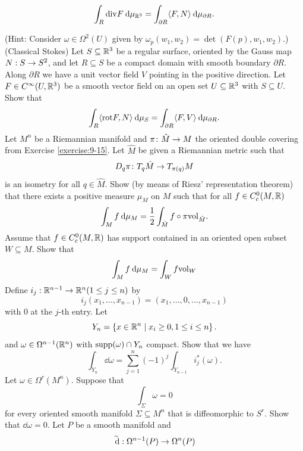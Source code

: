 \begin{enumerate}[label=\theexercise.\arabic*.,ref=\theexercise.\arabic*,leftmargin=2.7em]
    \[
      \int_{R}\R{div}{F}\dd{\mu }_{{\RR}^{3}} =\int_{\partial R}\langle F,N\rangle \dd{\mu }_{\partial R}.
    \]
    \par(Hint: Consider $\omega  \in  {\Omega }^{2}( U)$ given by ${\omega }_{p}( {{w}_{1},{w}_{2}})  = \det ( {F( p),{w}_{1},{w}_{2}})$.)
  \NewItem (Classical Stokes) Let $S \subseteq  {\ensuremath{\mathbb{R}}}^{3}$ be a regular surface, oriented by the Gauss map $N : S \rightarrow  {S}^{2}$, and let $R \subseteq  S$ be a compact domain with smooth boundary $\partial R$. Along $\partial R$ we have a unit vector field $V$ pointing in the positive direction. Let $F \in  {C}^{\infty }( {U,{\mathbb{R}}^{3}})$ be a smooth vector field on an open set $U \subseteq  {\ensuremath{\mathbb{R}}}^{3}$ with $S \subseteq  U$. Show that
    \[
      \int_{R}\langle \R{rot}F,N\rangle \dd{\mu }_{S} =\int_{\partial R}\langle F,V\rangle \dd{\mu }_{\partial R}.
    \]
  \NewItem Let ${M}^{n}$ be a Riemannian manifold and $\pi\colon  \hat{M} \rightarrow  M$ the oriented double covering from Exercise \ref{exercise:9-15}. Let $\hat{M}$ be given a Riemannian metric such that
    \[
      {D}_{q}\pi\colon  {T}_{q}\hat{M} \rightarrow  {T}_{\pi ( q) }M
    \]
    is an isometry for all $q \in  \hat{M}$.
    Show (by means of Riesz' representation theorem) that there exists a positive measure ${\mu }_{M}$ on $M$ such that for all $f \in  {C}_{c}^{0}( {M,\mathbb{R}})$
    \[
      \int_{M}{f}\dd{\mu }_{M} = \frac{1}{2}\int_{\hat{M}}f \circ  \pi {\R{vol}}_{\hat{M}}.
    \]
    Assume that $f \in  {C}_{c}^{0}( {M,\mathbb{R}})$ has support contained in an oriented open subset $W \subseteq  M$. Show that
    \[
      \int_{M}{f}\dd{\mu }_{M} =\int_{W}f{\R{vol}}_{ W}
    \]
  \NewItem Define ${i}_{j} : {\mathbb{R}}^{n- 1} \rightarrow  {\ensuremath{\mathbb{R}}}^{n}( {1 \leq  j \leq  n})$ by
    \[
      {i}_{j}( {{x}_{1},\ldots,{x}_{n- 1}})  = ( {{x}_{1},\ldots,0,\ldots,{x}_{n- 1}})
    \]
    with 0 at the $j$-th entry. Let
    \[
      {Y}_{n} = \left\{  {x \in  {\ensuremath{\mathbb{R}}}^{n} \mid  {x}_{i} \geq  0,1 \leq  i \leq  n}\right\} .
    \]
    and $\omega  \in  {\Omega }^{n- 1}( {\mathbb{R}}^{n})$ with $\mathrm{supp}( \omega )  \cap  {Y}_{n}$ compact. Show that we have
    \[
      \int_{{Y}_{n}}{\dd\omega } = \sum_{{j = 1}}^{n}{(-1) }^{j}\int_{Y_{n- 1}}{i}_{j}^*( \omega ).
    \]
  \NewItem Let $\omega \in  {\Omega }^{r}( {M}^{n})$. Suppose that
    \[
      \int_{\Sigma }\omega  = 0
    \]
    for every oriented smooth manifold $\Sigma \subseteq  {M}^{n}$ that is diffeomorphic to ${S}^{r}$. Show that ${\dd\omega } = 0$.
  \NewItem Let $P$ be a smooth manifold and
    \[
      \widetilde{\dd}: {\Omega }^{n- 1}( P)  \ra  {\Omega }^{n}( P)
\]
\end{enumerate}
